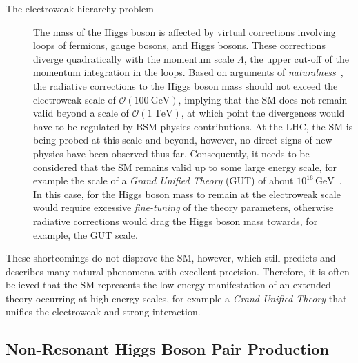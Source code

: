 \begin{description}
\item[The electroweak hierarchy problem] The mass of the Higgs boson is affected
  by virtual corrections involving loops of fermions, gauge bosons, and Higgs
  bosons. These corrections diverge quadratically with the momentum scale
  $\Lambda$, the upper cut-off of the momentum integration in the loops. Based
  on arguments of
  \emph{naturalness}~\cite{Gildener:1976ai,Weinberg:1978ym,Susskind:1978ms,Giudice:2008bi},
  the radiative corrections to the Higgs boson mass should not exceed the
  electroweak scale of $\mathcal{O}(\SI{100}{\GeV})$, implying that the SM does
  not remain valid beyond a scale of $\mathcal{O}(\SI{1}{\TeV})$, at which point
  the divergences would have to be regulated by BSM physics contributions. At
  the LHC, the SM is being probed at this scale and beyond, however, no direct
  signs of new physics have been observed thus far. Consequently, it needs to be
  considered that the SM remains valid up to some large energy scale, for
  example the scale of a \emph{Grand Unified Theory} (GUT) of about
  $10^{16}\,\si{\GeV}$~\cite{pdg2020}. In this case, for the Higgs boson mass to
  remain at the electroweak scale would require excessive \emph{fine-tuning} of
  the theory parameters, otherwise radiative corrections would drag the Higgs
  boson mass towards, for example, the GUT scale.


\end{description}
These shortcomings do not disprove the SM, however, which still predicts and
describes many natural phenomena with excellent precision. Therefore, it is
often believed that the SM represents the low-energy manifestation of an
extended theory occurring at high energy scales, for example a \emph{Grand
  Unified Theory} that unifies the electroweak and strong interaction.


\subsection{Non-Resonant Higgs Boson Pair Production}%
\label{sec:bsm_nonresonant_hh}

